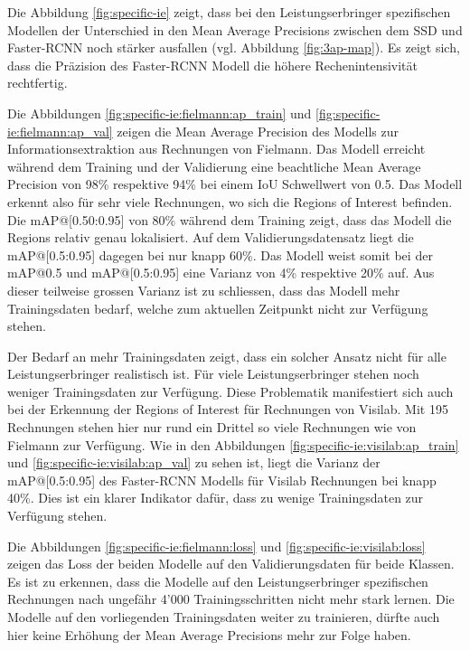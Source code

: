 Die Abbildung \ref{fig:specific-ie} zeigt, dass bei den Leistungserbringer spezifischen Modellen der Unterschied in den Mean Average Precisions zwischen dem SSD und Faster-RCNN noch stärker ausfallen (vgl. Abbildung \ref{fig:3ap-map}). Es zeigt sich, dass die Präzision des Faster-RCNN Modell die höhere Rechenintensivität rechtfertig.

Die Abbildungen \ref{fig:specific-ie:fielmann:ap_train} und \ref{fig:specific-ie:fielmann:ap_val} zeigen die Mean Average Precision des Modells zur Informationsextraktion aus Rechnungen von Fielmann. Das Modell erreicht während dem Training und der Validierung eine beachtliche Mean Average Precision von 98\% respektive 94\% bei einem IoU Schwellwert von 0.5. Das Modell erkennt also für sehr viele Rechnungen, wo sich die Regions of Interest befinden. Die mAP@[0.50:0.95] von 80\% während dem Training zeigt, dass das Modell die Regions relativ genau lokalisiert. Auf dem Validierungsdatensatz liegt die mAP@[0.5:0.95] dagegen bei nur knapp 60\%. Das Modell weist somit bei der mAP@0.5 und mAP@[0.5:0.95] eine Varianz von 4\% respektive 20\% auf. Aus dieser teilweise grossen Varianz ist zu schliessen, dass das Modell mehr Trainingsdaten bedarf, welche zum aktuellen Zeitpunkt nicht zur Verfügung stehen.

Der Bedarf an mehr Trainingsdaten zeigt, dass ein solcher Ansatz nicht für alle Leistungserbringer realistisch ist. Für viele Leistungserbringer stehen noch weniger Trainingsdaten zur Verfügung. Diese Problematik manifestiert sich auch bei der Erkennung der Regions of Interest für Rechnungen von Visilab. Mit 195 Rechnungen stehen hier nur rund ein Drittel so viele Rechnungen wie von Fielmann zur Verfügung. Wie in den Abbildungen \ref{fig:specific-ie:visilab:ap_train} und \ref{fig:specific-ie:visilab:ap_val} zu sehen ist, liegt die Varianz der mAP@[0.5:0.95] des Faster-RCNN Modells für Visilab Rechnungen bei knapp 40\%. Dies ist ein klarer Indikator dafür, dass zu wenige Trainingsdaten zur Verfügung stehen.

Die Abbildungen \ref{fig:specific-ie:fielmann:loss} und  \ref{fig:specific-ie:visilab:loss} zeigen das Loss der beiden Modelle auf den Validierungsdaten für beide Klassen. Es ist zu erkennen, dass die Modelle auf den Leistungserbringer spezifischen Rechnungen nach ungefähr 4'000 Trainingsschritten nicht mehr stark lernen. Die Modelle auf den vorliegenden Trainingsdaten weiter zu trainieren, dürfte auch hier keine Erhöhung der Mean Average Precisions mehr zur Folge haben.


